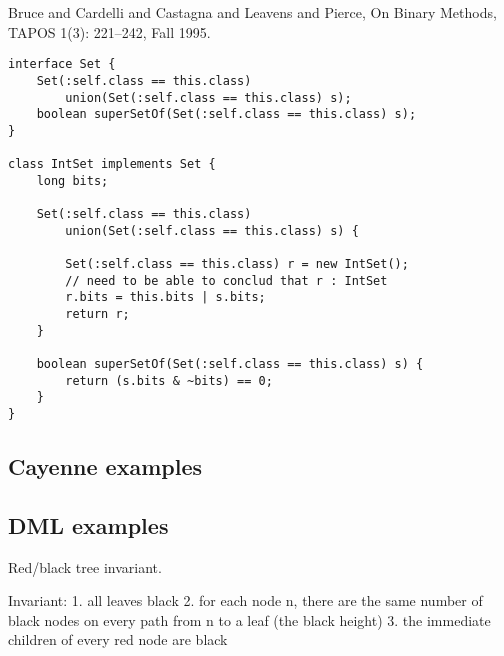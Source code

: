 \documentclass[nocopyrightspace,preprint,9pt]{sigplanconf}
\begin{document}
Bruce and Cardelli and Castagna and Leavens and Pierce,
On Binary Methods, TAPOS 1(3): 221--242, Fall 1995.

\begin{verbatim}
interface Set {
    Set(:self.class == this.class)
        union(Set(:self.class == this.class) s);
    boolean superSetOf(Set(:self.class == this.class) s);
}

class IntSet implements Set {
    long bits;

    Set(:self.class == this.class)
        union(Set(:self.class == this.class) s) {

        Set(:self.class == this.class) r = new IntSet();
        // need to be able to conclud that r : IntSet
        r.bits = this.bits | s.bits;
        return r;
    }

    boolean superSetOf(Set(:self.class == this.class) s) {
        return (s.bits & ~bits) == 0;
    }
}
\end{verbatim}

\subsection{Cayenne examples}





\subsection{DML examples}

Red/black tree invariant.

Invariant:
1. all leaves black
2. for each node n, there are the same number of black nodes on
every path from n to a leaf (the black height)
3. the immediate children of every red node are black
\end{document}
